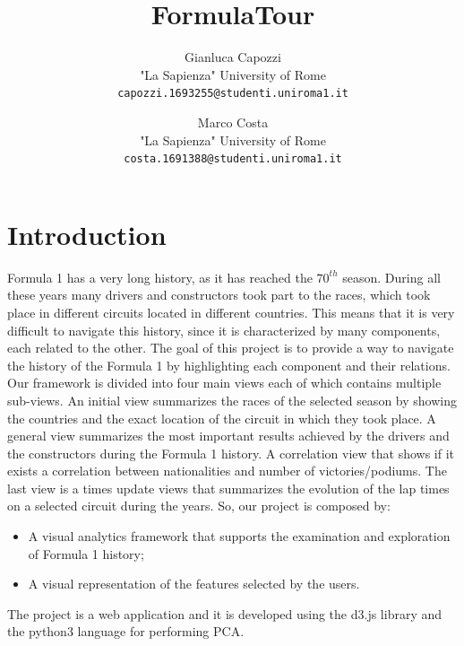 \documentclass[10pt,twocolumn,letterpaper]{article}
\title{\LARGE FormulaTour}
\author{Gianluca Capozzi\\
	"La Sapienza" University of Rome\\
	{\tt\small capozzi.1693255@studenti.uniroma1.it}
	\and
	Marco Costa\\
	"La Sapienza" University of Rome\\
	{\tt\small costa.1691388@studenti.uniroma1.it}
}
\begin{document}

\begin{abstract}

\end{abstract}

\section{Introduction}
Formula 1 has a very long history, as it has reached the $70^{th}$ season. During all these years many drivers and constructors took part to the races, which took
place in different circuits located in different countries. This means that it is very difficult to navigate this history, since it is characterized by many components,
each related to the other. The goal of this project is to provide a way to navigate the history of the Formula 1 by highlighting each component and their relations.
Our framework is divided into four main views each of which contains multiple sub-views. An initial view summarizes the races of the selected season by showing
the countries and the exact location of the circuit in which they took place. A general view summarizes the most important results achieved by the drivers and the
constructors during the Formula 1 history. A correlation view that shows if it exists a correlation between nationalities and number of victories/podiums. The last
view is a times update views that summarizes the evolution of the lap times on a selected circuit during the years. So, our project is composed by:
\begin{itemize}
	\item A visual analytics framework that supports the examination and exploration of Formula 1 history;
	\item A visual representation of the features selected by the users.
\end{itemize}
The project is a web application and it is developed using the d3.js \cite{D3} library and the python3 language for performing PCA.
\end{document}
